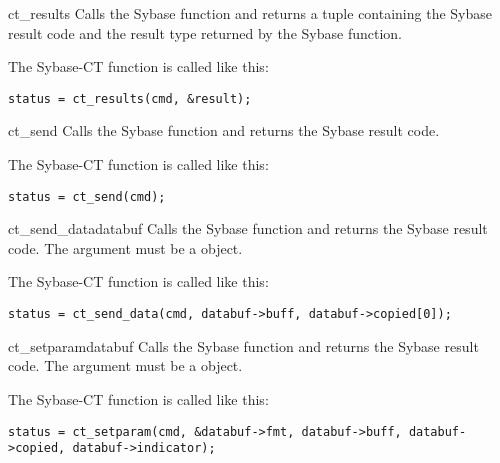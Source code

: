 \begin{methoddesc}[CS_COMMAND]{ct_results}{}
Calls the Sybase  function and returns a tuple
containing the Sybase result code and the result type returned by the
Sybase function.

The Sybase-CT  function is called like this:

\begin{verbatim}
status = ct_results(cmd, &result);
\end{verbatim}
\end{methoddesc}

\begin{methoddesc}[CS_COMMAND]{ct_send}{}
Calls the Sybase  function and returns the Sybase
result code.

The Sybase-CT  function is called like this:

\begin{verbatim}
status = ct_send(cmd);
\end{verbatim}
\end{methoddesc}

\begin{methoddesc}[CS_COMMAND]{ct_send_data}{databuf}
Calls the Sybase  function and returns the
Sybase result code.  The  argument must be a
 object.

The Sybase-CT  function is called like this:

\begin{verbatim}
status = ct_send_data(cmd, databuf->buff, databuf->copied[0]);
\end{verbatim}
\end{methoddesc}

\begin{methoddesc}[CS_COMMAND]{ct_setparam}{databuf}
Calls the Sybase  function and returns the
Sybase result code.  The  argument must be a
 object.

The Sybase-CT  function is called like this:

\begin{verbatim}
status = ct_setparam(cmd, &databuf->fmt, databuf->buff, databuf->copied, databuf->indicator);
\end{verbatim}
\end{methoddesc}

